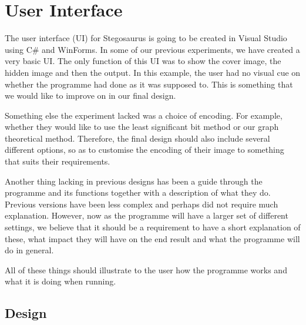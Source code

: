 \section{User Interface}

The user interface (UI) for Stegosaurus is going to be created in Visual Studio using C\# and WinForms.
In some of our previous experiments, we have created a very basic UI.
The only function of this UI was to show the cover image, the hidden image and then the output.
In this example, the user had no visual cue on whether the programme had done as it was supposed to.
This is something that we would like to improve on in our final design.

Something else the experiment lacked was a choice of encoding.
For example, whether they would like to use the least significant bit method or our graph theoretical method.
Therefore, the final design should also include several different options, so as to customise the encoding of their image to something that suits their requirements.

Another thing lacking in previous designs has been a guide through the programme and its functions together with a description of what they do.
Previous versions have been less complex and perhaps did not require much explanation.
However, now as the programme will have a larger set of different settings, we believe that it should be a requirement to have a short explanation of these, what impact they will have on the end result and what the programme will do in general.

All of these things should illustrate to the user how the programme works and what it is doing when running.

\subsection{Design}

